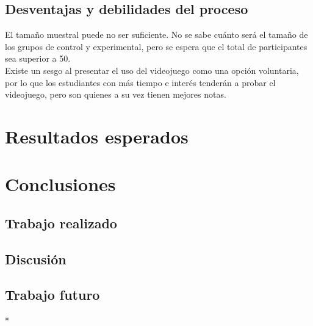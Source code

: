\documentclass[submission]{eptcs}
\begin{document}
\subsection{Desventajas y debilidades del proceso}

El tamaño muestral puede no ser suficiente. No se sabe cuánto será el tamaño de los grupos de control
y experimental, pero se espera que el total de participantes sea superior a 50. \\
Existe un sesgo al presentar el uso del videojuego como una opción voluntaria, por lo que los estudiantes
con más tiempo e interés tenderán a probar el videojuego, pero son quienes a su vez tienen mejores notas. \\


\section{Resultados esperados}


\section{Conclusiones}

\subsection{Trabajo realizado}


\subsection{Discusión}


\subsection{Trabajo futuro}
* 




\nocite{*}


\end{document}
